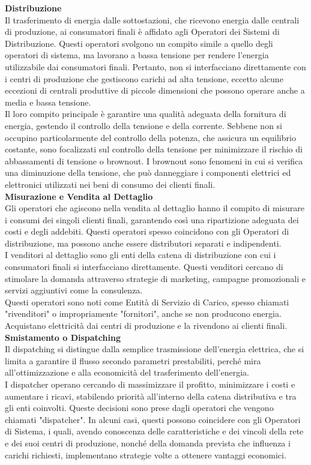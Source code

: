 \documentclass{article}
\begin{document}
\textbf{Distribuzione}\\
Il trasferimento di energia dalle sottostazioni, che ricevono energia dalle centrali di produzione, ai consumatori finali è affidato agli Operatori dei Sistemi di Distribuzione. Questi operatori svolgono un compito simile a quello degli operatori di sistema, ma lavorano a bassa tensione per rendere l'energia utilizzabile dai consumatori finali. Pertanto, non si interfacciano direttamente con i centri di produzione che gestiscono carichi ad alta tensione, eccetto alcune eccezioni di centrali produttive di piccole dimensioni che possono operare anche a media e bassa tensione.\\
Il loro compito principale è garantire una qualità adeguata della fornitura di energia, gestendo il controllo della tensione e della corrente. Sebbene non si occupino particolarmente del controllo della potenza, che assicura un equilibrio costante, sono focalizzati sul controllo della tensione per minimizzare il rischio di abbassamenti di tensione o brownout. I brownout sono fenomeni in cui si verifica una diminuzione della tensione, che può danneggiare i componenti elettrici ed elettronici utilizzati nei beni di consumo dei clienti finali.\\
\textbf{Misurazione e Vendita al Dettaglio}\\
Gli operatori che agiscono nella vendita al dettaglio hanno il compito di misurare i consumi dei singoli clienti finali, garantendo così una ripartizione adeguata dei costi e degli addebiti. Questi operatori spesso coincidono con gli Operatori di distribuzione, ma possono anche essere distributori separati e indipendenti.\\
I venditori al dettaglio sono gli enti della catena di distribuzione con cui i consumatori finali si interfacciano direttamente. Questi venditori cercano di stimolare la domanda attraverso strategie di marketing, campagne promozionali e servizi aggiuntivi come la consulenza.\\
Questi operatori sono noti come Entità di Servizio di Carico, spesso chiamati "rivenditori" o impropriamente "fornitori", anche se non producono energia. Acquistano elettricità dai centri di produzione e la rivendono ai clienti finali.\\
\textbf{Smistamento o Dispatching}\\
Il dispatching si distingue dalla semplice trasmissione dell'energia elettrica, che si limita a garantire il flusso secondo parametri prestabiliti, perché mira all'ottimizzazione e alla economicità del trasferimento dell'energia.\\
I dispatcher operano cercando di massimizzare il profitto, minimizzare i costi e aumentare i ricavi, stabilendo priorità all'interno della catena distributiva e tra gli enti coinvolti. Queste decisioni sono prese dagli operatori che vengono chiamati "dispatcher". In alcuni casi, questi possono coincidere con gli Operatori di Sistema, i quali, avendo conoscenza delle caratteristiche e dei vincoli della rete e dei suoi centri di produzione, nonché della domanda prevista che influenza i carichi richiesti, implementano strategie volte a ottenere vantaggi economici.\\
\end{document}
